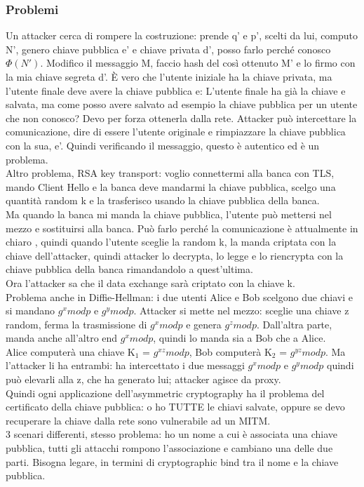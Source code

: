 \documentclass[16px]{article}
\begin{document}
\subsubsection{Problemi}
Un attacker cerca di rompere la costruzione: prende q' e p', scelti da lui, computo N', genero chiave pubblica e' e chiave privata d', posso farlo perché conosco $\Phi(N')$. Modifico il messaggio M, faccio hash del così ottenuto M' e lo firmo con la mia chiave segreta d'. È vero che l'utente iniziale ha la chiave privata, ma l'utente finale deve avere la chiave pubblica e:
L'utente finale ha già la chiave e salvata, ma come posso avere salvato ad esempio la chiave pubblica per un utente che non conosco? Devo per forza ottenerla dalla rete. Attacker può intercettare la comunicazione, dire di essere l'utente originale e rimpiazzare la chiave pubblica con la sua, e'. Quindi verificando il messaggio, questo è autentico ed è un problema.\\
Altro problema, RSA key transport: voglio connettermi alla banca con TLS, mando Client Hello e la banca deve mandarmi la chiave pubblica, scelgo una quantità random k e la trasferisco usando la chiave pubblica della banca.\\ Ma quando la banca mi manda la chiave pubblica, l'utente può mettersi nel mezzo e sostituirsi alla banca. Può farlo perché la comunicazione è attualmente in chiaro , quindi quando l'utente sceglie la random k, la manda criptata con la chiave dell'attacker, quindi attacker lo decrypta, lo legge e lo riencrypta con la chiave pubblica della banca rimandandolo a quest'ultima.\\ Ora l'attacker sa che il data exchange sarà criptato con la chiave k.\\ Problema anche in Diffie-Hellman: i due utenti Alice e Bob scelgono due chiavi e si mandano $g^xmodp$ e $g^ymodp$. Attacker si mette nel mezzo: sceglie una chiave z random, ferma la trasmissione di $g^xmodp$ e genera $g^zmodp$. Dall'altra parte, manda anche all'altro end $g^xmodp$, quindi lo manda sia a Bob che a Alice.\\ Alice computerà una chiave K$_{1}$ = $g^{xz}modp$, Bob computerà K$_2$ = $g^{yz}modp$. Ma l'attacker li ha entrambi: ha intercettato i due messaggi $g^xmodp$ e $g^ymodp$ quindi può elevarli alla z, che ha generato lui; attacker agisce da proxy.\\ Quindi ogni applicazione dell'asymmetric cryptography ha il problema del certificato della chiave pubblica: o ho TUTTE le chiavi salvate, oppure se devo recuperare la chiave dalla rete sono vulnerabile ad un MITM.\\ 3 scenari differenti, stesso problema: ho un nome a cui è associata una chiave pubblica, tutti gli attacchi rompono l'associazione e cambiano una delle due parti. Bisogna legare, in termini di cryptographic bind tra il nome e la chiave pubblica.
\end{document}
